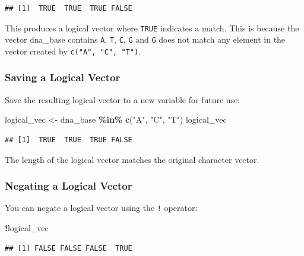 \documentclass[
]{book}
\newenvironment{Shaded}{\begin{snugshade}}{\end{snugshade}}
\newcommand{\FunctionTok}[1]{\textcolor[rgb]{0.13,0.29,0.53}{\textbf{#1}}}
\newcommand{\NormalTok}[1]{#1}
\newcommand{\OtherTok}[1]{\textcolor[rgb]{0.56,0.35,0.01}{#1}}
\newcommand{\SpecialCharTok}[1]{\textcolor[rgb]{0.81,0.36,0.00}{\textbf{#1}}}
\newcommand{\StringTok}[1]{\textcolor[rgb]{0.31,0.60,0.02}{#1}}
\begin{document}
\begin{verbatim}
## [1]  TRUE  TRUE  TRUE FALSE
\end{verbatim}

This produces a logical vector where \texttt{TRUE} indicates a match. This is because the vector dna\_base contains \texttt{A}, \texttt{T}, \texttt{C}, \texttt{G} and \texttt{G} does not match any element in the vector created by \texttt{c("A",\ "C",\ "T")}.

\hypertarget{saving-a-logical-vector}{%
\subsubsection{Saving a Logical Vector}\label{saving-a-logical-vector}}

Save the resulting logical vector to a new variable for future use:

\begin{Shaded}
\begin{Highlighting}[]
\NormalTok{logical\_vec }\OtherTok{\textless{}{-}}\NormalTok{ dna\_base }\SpecialCharTok{\%in\%} \FunctionTok{c}\NormalTok{(}\StringTok{"A"}\NormalTok{, }\StringTok{"C"}\NormalTok{, }\StringTok{"T"}\NormalTok{)}
\NormalTok{logical\_vec}
\end{Highlighting}
\end{Shaded}

\begin{verbatim}
## [1]  TRUE  TRUE  TRUE FALSE
\end{verbatim}

The length of the logical vector matches the original character vector.

\hypertarget{negating-a-logical-vector}{%
\subsubsection{Negating a Logical Vector}\label{negating-a-logical-vector}}

You can negate a logical vector using the \texttt{!} operator:

\begin{Shaded}
\begin{Highlighting}[]
\SpecialCharTok{!}\NormalTok{logical\_vec}
\end{Highlighting}
\end{Shaded}

\begin{verbatim}
## [1] FALSE FALSE FALSE  TRUE
\end{verbatim}
\end{document}
